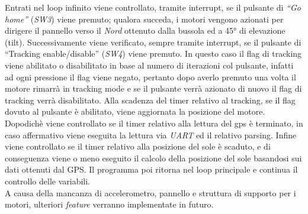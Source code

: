 \noindent Entrati nel loop infinito viene controllato, tramite interrupt, se il
pulsante di \emph{``Go home''} (\emph{SW3}) viene premuto; qualora
succeda, i motori vengono azionati per dirigere il pannello verso il
\emph{Nord} ottenuto dalla bussola ed a 45° di elevazione (tilt).
Successivamente viene verificato, sempre tramite interrupt, se il
pulsante di ``Tracking enable/disable'' (\emph{SW4}) viene premuto. In
questo caso il flag di tracking viene abilitato o disabilitato in base
al numero di iterazioni col pulsante, infatti ad ogni pressione il flag
viene negato, pertanto dopo averlo premuto una volta il motore rimarrà
in tracking mode e se il pulsante verrà azionato di nuovo il flag di
tracking verrà disabilitato. Alla scadenza del timer relativo al
tracking, se il flag dovuto al pulsante è abilitato, viene aggiornata la
posizione del motore. Dopodichè viene controllato se il timer relativo
alla lettura del gps è terminato, in caso affermativo viene eseguita la
lettura via \textit{UART} ed il relativo parsing. Infine viene controllato se il
timer relativo alla posizione del sole è scaduto, e di conseguenza viene
o meno eseguito il calcolo della posizione del sole basandosi sui dati
ottenuti dal GPS. Il programma poi ritorna nel loop principale e
continua il controllo delle variabili.\\
A causa della mancanza di accelerometro, pannello e struttura di
supporto per i motori, ulteriori \emph{feature} verranno implementate in
futuro.